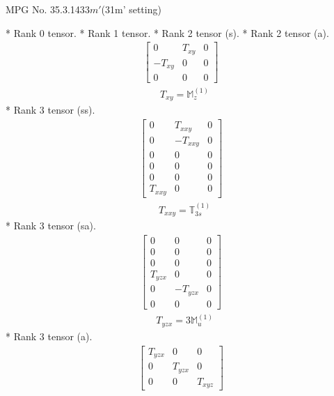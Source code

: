 \documentclass[fleqn,8pt,landscape]{jsarticle}
\begin{document}
\setcounter{MaxMatrixCols}{32}

\renewcommand{\tablename}{Table~}
\renewcommand{\figurename}{Figure~}
\begin{center}
\LARGE
MPG No. 35.3.143\quad$3m'$\quad(31m' setting)
\end{center}
* Rank 0 tensor.
* Rank 1 tensor.
* Rank 2 tensor (s).
* Rank 2 tensor (a).
\begin{align*}
\begin{bmatrix} 0 & T_{xy} & 0 \\ - T_{xy} & 0 & 0 \\ 0 & 0 & 0 \end{bmatrix}
\end{align*}
\begin{align*}
& T_{xy} = \mathbb{M}_{z}^{(1)}
\end{align*}
* Rank 3 tensor (ss).
\begin{align*}
\begin{bmatrix} 0 & T_{xxy} & 0 \\ 0 & - T_{xxy} & 0 \\ 0 & 0 & 0 \\ 0 & 0 & 0 \\ 0 & 0 & 0 \\ T_{xxy} & 0 & 0 \end{bmatrix}
\end{align*}
\begin{align*}
& T_{xxy} = \mathbb{T}_{3s}^{(1)}
\end{align*}
* Rank 3 tensor (sa).
\begin{align*}
\begin{bmatrix} 0 & 0 & 0 \\ 0 & 0 & 0 \\ 0 & 0 & 0 \\ T_{yzx} & 0 & 0 \\ 0 & - T_{yzx} & 0 \\ 0 & 0 & 0 \end{bmatrix}
\end{align*}
\begin{align*}
& T_{yzx} = 3 \mathbb{M}_{u}^{(1)}
\end{align*}
* Rank 3 tensor (a).
\begin{align*}
\begin{bmatrix} T_{yzx} & 0 & 0 \\ 0 & T_{yzx} & 0 \\ 0 & 0 & T_{xyz} \end{bmatrix}
\end{align*}
\end{document}
